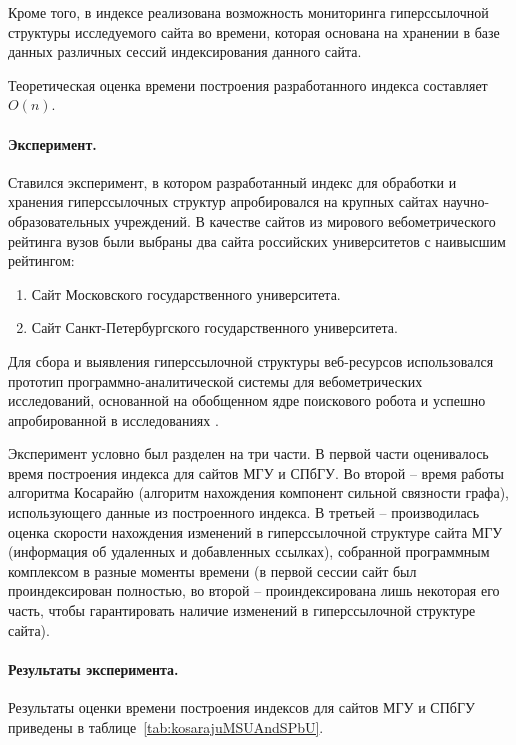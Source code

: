 Кроме того, в индексе реализована возможность мониторинга гиперссылочной структуры исследуемого сайта во времени, которая основана на хранении в базе данных различных сессий индексирования данного сайта.

Теоретическая оценка времени построения разработанного индекса составляет \(O(n)\).

\paragraph{Эксперимент.} Ставился эксперимент, в котором разработанный индекс для обработки и хранения гиперссылочных структур апробировался на крупных сайтах научно-образовательных учреждений. В качестве сайтов из мирового вебометрического рейтинга вузов \cite{RankingWeb} были выбраны два сайта российских университетов с наивысшим рейтингом:

\begin{enumerate}
	\item Сайт Московского государственного университета.
	\item Сайт Санкт-Петербургского государственного университета.
\end{enumerate}

Для сбора и выявления гиперссылочной структуры веб-ресурсов использовался прототип программно-аналитической системы для вебометрических исследований, основанной на обобщенном ядре поискового робота и успешно апробированной в исследованиях \cite{MaksimovBlekanov,BlekanovSergeevMaksimovBOWTIE}.

Эксперимент условно был разделен на три части. В первой части оценивалось время построения индекса для сайтов МГУ и СПбГУ. Во второй -- время работы алгоритма Косарайю (алгоритм нахождения компонент сильной связности графа), использующего данные из построенного индекса. В третьей -- производилась оценка скорости нахождения изменений в гиперссылочной структуре сайта МГУ (информация об удаленных и добавленных ссылках), собранной программным комплексом в разные моменты времени (в первой сессии сайт был проиндексирован полностью, во второй -- проиндексирована лишь некоторая его часть, чтобы гарантировать наличие изменений в гиперссылочной структуре сайта).

\paragraph{Результаты эксперимента.} Результаты оценки времени построения индексов для сайтов МГУ и СПбГУ приведены в таблице~\cref{tab:kosarajuMSUAndSPbU}.

